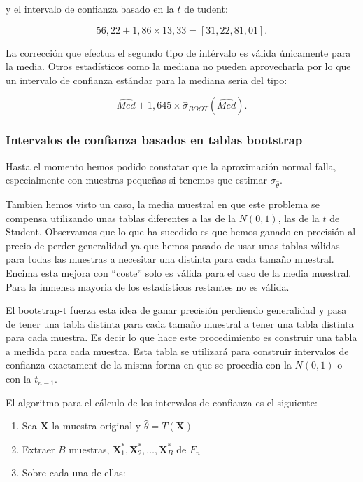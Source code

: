 \documentclass[
]{article}
\providecommand{\tightlist}{%
  \setlength{\itemsep}{0pt}\setlength{\parskip}{0pt}}
\begin{document}
y el intervalo de confianza basado en la \(t\) de tudent:

\[
56,22 \pm 1,86 \times 13,33=[31,22,81,01] .
\]

La corrección que efectua el segundo tipo de intérvalo es válida únicamente para la media. Otros estadísticos como la mediana no pueden aprovecharla por lo que un intervalo de confianza estándar para la mediana seria del tipo:

\[
\widehat{M e d} \pm 1,645 \times \hat{\sigma}_{B O O T}(\widehat{M e d}) .
\]

\subsubsection{Intervalos de confianza basados en tablas bootstrap}\label{intervalos-de-confianza-basados-en-tablas-bootstrap-1}

Hasta el momento hemos podido constatar que la aproximación normal falla, especialmente con muestras pequeñas si tenemos que estimar \(\sigma_{\hat{\theta}}\).

Tambien hemos visto un caso, la media muestral en que este problema se compensa utilizando unas tablas diferentes a las de la \(N(0,1)\), las de la \(t\) de Student. Observamos que lo que ha sucedido es que hemos ganado en precisión al precio de perder generalidad ya que hemos pasado de usar unas tablas válidas para todas las muestras a necesitar una distinta para cada tamaño muestral. Encima esta mejora con ``coste'' solo es válida para el caso de la media muestral. Para la inmensa mayoria de los estadísticos restantes no es válida.

El bootstrap-t fuerza esta idea de ganar precisión perdiendo generalidad y pasa de tener una tabla distinta para cada tamaño muestral a tener una tabla distinta para cada muestra. Es decir lo que hace este procedimiento es construir una tabla a medida para cada muestra. Esta tabla se utilizará para construir intervalos de confianza exactament de la misma forma en que se procedia con la \(N(0,1)\) o con la \(t_{n-1}\).

El algoritmo para el cálculo de los intervalos de confianza es el siguiente:

\begin{enumerate}
\def\labelenumi{\arabic{enumi}.}
\tightlist
\item
  Sea \(\mathbf{X}\) la muestra original y \(\hat{\theta}=T(\mathbf{X})\)
\item
  Extraer \(B\) muestras, \(\mathbf{X}_{1}^{*}, \mathbf{X}_{2}^{*}, \ldots, \mathbf{X}_{B}^{*}\) de \(F_{n}\)
\item
  Sobre cada una de ellas:
\end{enumerate}
\end{document}
